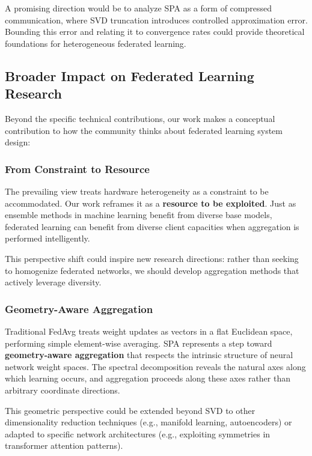 \documentclass[conference]{IEEEtran}
\begin{document}
A promising direction would be to analyze SPA as a form of compressed communication, where SVD truncation introduces controlled approximation error. Bounding this error and relating it to convergence rates could provide theoretical foundations for heterogeneous federated learning.

\subsection{Broader Impact on Federated Learning Research}

Beyond the specific technical contributions, our work makes a conceptual contribution to how the community thinks about federated learning system design:

\subsubsection{From Constraint to Resource}

The prevailing view treats hardware heterogeneity as a constraint to be accommodated. Our work reframes it as a \textbf{resource to be exploited}. Just as ensemble methods in machine learning benefit from diverse base models, federated learning can benefit from diverse client capacities when aggregation is performed intelligently.

This perspective shift could inspire new research directions: rather than seeking to homogenize federated networks, we should develop aggregation methods that actively leverage diversity.

\subsubsection{Geometry-Aware Aggregation}

Traditional FedAvg treats weight updates as vectors in a flat Euclidean space, performing simple element-wise averaging. SPA represents a step toward \textbf{geometry-aware aggregation} that respects the intrinsic structure of neural network weight spaces. The spectral decomposition reveals the natural axes along which learning occurs, and aggregation proceeds along these axes rather than arbitrary coordinate directions.

This geometric perspective could be extended beyond SVD to other dimensionality reduction techniques (e.g., manifold learning, autoencoders) or adapted to specific network architectures (e.g., exploiting symmetries in transformer attention patterns).
\end{document}
